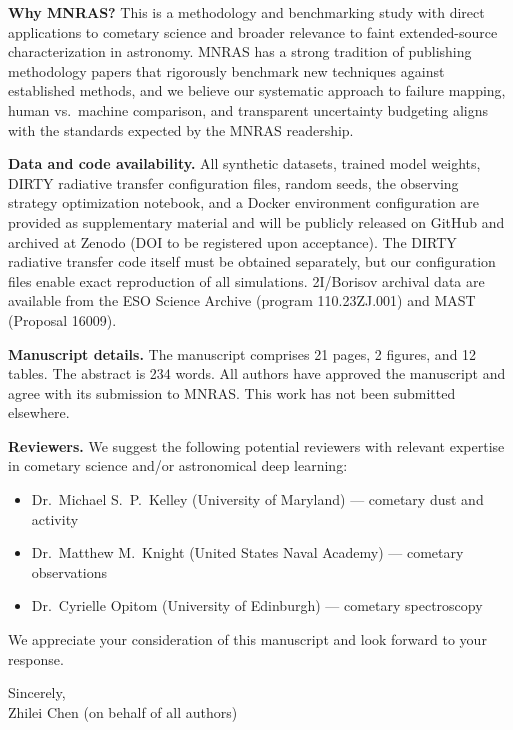 \documentclass[12pt]{article}
\begin{document}
\vspace{1em}
\noindent\textbf{Why MNRAS?}
This is a methodology and benchmarking study with direct applications to cometary science and broader relevance to faint extended-source characterization in astronomy. MNRAS has a strong tradition of publishing methodology papers that rigorously benchmark new techniques against established methods, and we believe our systematic approach to failure mapping, human vs.\ machine comparison, and transparent uncertainty budgeting aligns with the standards expected by the MNRAS readership.

\vspace{1em}
\noindent\textbf{Data and code availability.}
All synthetic datasets, trained model weights, DIRTY radiative transfer configuration files, random seeds, the observing strategy optimization notebook, and a Docker environment configuration are provided as supplementary material and will be publicly released on GitHub and archived at Zenodo (DOI to be registered upon acceptance). The DIRTY radiative transfer code itself must be obtained separately, but our configuration files enable exact reproduction of all simulations. 2I/Borisov archival data are available from the ESO Science Archive (program 110.23ZJ.001) and MAST (Proposal 16009).

\vspace{1em}
\noindent\textbf{Manuscript details.}
The manuscript comprises 21 pages, 2 figures, and 12 tables. The abstract is 234 words. All authors have approved the manuscript and agree with its submission to MNRAS. This work has not been submitted elsewhere.

\vspace{1em}
\noindent\textbf{Reviewers.}
We suggest the following potential reviewers with relevant expertise in cometary science and/or astronomical deep learning:
\begin{itemize}
    \item Dr.\ Michael S.\ P.\ Kelley (University of Maryland) --- cometary dust and activity
    \item Dr.\ Matthew M.\ Knight (United States Naval Academy) --- cometary observations
    \item Dr.\ Cyrielle Opitom (University of Edinburgh) --- cometary spectroscopy
\end{itemize}

\vspace{1em}
We appreciate your consideration of this manuscript and look forward to your response.

\vspace{2em}

Sincerely, \\[2em]

Zhilei Chen (on behalf of all authors)
\end{document}
